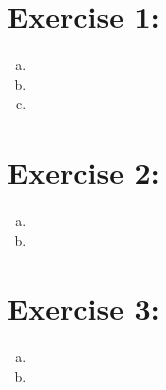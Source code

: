 \documentclass[a4paper]{article}
\begin{document}
	\section*{Exercise 1: }\label{sec:exercise1}
   \begin{enumerate}[a.]
		\item 
        \item
        \item
   \end{enumerate}

	\section*{Exercise 2: }\label{sec:exercise2}
        \begin{enumerate}[a.]
            \item
            \item
        \end{enumerate}


	\section*{Exercise 3: }\label{sec:exercise3}
	\begin{enumerate}[a.]
        \item 
        \item 
    \end{enumerate}
\end{document}
